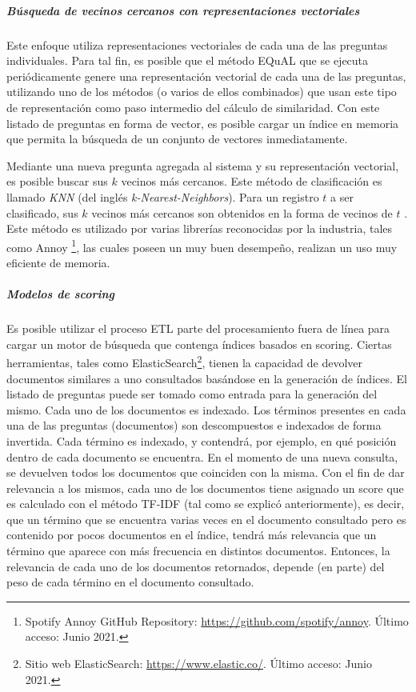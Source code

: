 \subparagraph{Búsqueda de vecinos cercanos con representaciones vectoriales}
Este enfoque utiliza representaciones vectoriales de cada una de las preguntas individuales. Para tal fin, es posible que el método EQuAL que se ejecuta periódicamente genere una representación vectorial de cada una de las preguntas, utilizando uno de los métodos (o varios de ellos combinados) que usan este tipo de representación como paso intermedio del cálculo de similaridad. Con este listado de preguntas en forma de vector, es posible cargar un índice en memoria que permita la búsqueda de un conjunto de vectores inmediatamente.

\bigskip Mediante una nueva pregunta agregada al sistema y su representación vectorial, es posible buscar sus \(k\) vecinos más cercanos. Este método de clasificación es llamado \textit{KNN} (del inglés \textit{k-Nearest-Neighbors}). Para un registro \(t\) a ser clasificado, sus \(k\) vecinos más cercanos son obtenidos en la forma de vecinos de \(t\) \citep{guo2003knn}. Este método es utilizado por varias librerías reconocidas por la industria, tales como Annoy \footnote{Spotify Annoy GitHub Repository: \url{https://github.com/spotify/annoy}. Último acceso: Junio 2021.}, las cuales poseen un muy buen desempeño, realizan un uso muy eficiente de memoria.

\subparagraph{Modelos de scoring}
Es posible utilizar el proceso ETL parte del procesamiento fuera de línea para cargar un motor de búsqueda que contenga índices basados en scoring. Ciertas herramientas, tales como ElasticSearch\footnote{Sitio web ElasticSearch: \url{https://www.elastic.co/}. Último acceso: Junio 2021.}, tienen la capacidad de devolver documentos similares a uno consultados basándose en la generación de índices. El listado de preguntas puede ser tomado como entrada para la generación del mismo. Cada uno de los documentos es indexado. Los términos presentes en cada una de las preguntas (documentos) son descompuestos e indexados de forma invertida. Cada término es  indexado, y contendrá, por ejemplo, en qué posición dentro de cada documento se encuentra. En el momento de una nueva consulta, se devuelven todos los documentos que coinciden con la misma. Con el fin de dar relevancia a los mismos, cada uno de los documentos tiene asignado un score que es calculado con el método TF-IDF (tal como se explicó anteriormente), es decir, que un término que se encuentra varias veces en el documento consultado pero es contenido por pocos documentos en el índice, tendrá más relevancia que un término que aparece con más frecuencia en distintos documentos. Entonces, la relevancia de cada uno de los documentos retornados, depende (en parte) del peso de cada término en el documento consultado.

